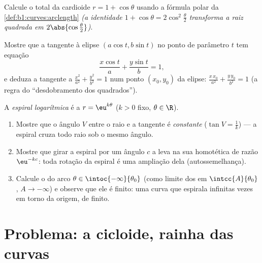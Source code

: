 \begin{exercise}[$\star\star$]\label{exo:b1:curves:10}
Calcule o  total da cardioide $r = 1 + \cos\theta$ usando a fórmula polar
da \cref{def:b1:curves:arclength} \emph{(a identidade $1 + \cos\theta = 2\cos^2\frac\theta2$ transforma a raiz quadrada em
$2\abs{\cos\frac\theta2}$)}.
\end{exercise}

\begin{exercise}[$\star\star$]\label{exo:b1:curves:11}
Mostre que a tangente à elipse $(a\cos t, b\sin t)$ no ponto de parâmetro $t$ tem
equação
\[
\frac{x\cos t}{a} + \frac{y\sin t}{b} = 1 ,
\]
e deduza a tangente a $\frac{x^2}{a^2} + \frac{y^2}{b^2} = 1$ num ponto $(x_0, y_0)$ da elipse: $\frac{x\,x_0}{a^2} +
\frac{y\,y_0}{b^2} = 1$ (a regra
do ``desdobramento dos quadrados'').
\end{exercise}

\begin{exercise}[$\star\star\star$]\label{exo:b1:curves:12}
A \emph{espiral logarítmica} é a  $r =
\eu^{k\theta}$ ($k > 0$ fixo,
$\theta \in \R$).
\begin{enumerate}
  \item Mostre que o ângulo $V$ entre o raio e a tangente é
        \emph{constante} ($\tan V = \frac1k$) --- a espiral cruza todo raio sob o
        mesmo ângulo.
  \item Mostre que girar a espiral por um ângulo $c$ a leva na sua
        homotética de razão $\eu^{-kc}$: toda rotação da espiral é uma
        ampliação dela (autossemelhança).
  \item Calcule o  do arco $\theta \in
        \intoc{-\infty}{\theta_0}$ (como limite dos
         em $\intcc{A}{\theta_0}$, $A \to -\infty$) e observe que ele é finito: uma
        curva que espirala infinitas vezes em torno da origem, de
         finito.
\end{enumerate}
\end{exercise}

\section{Problema: a cicloide, rainha das curvas}

